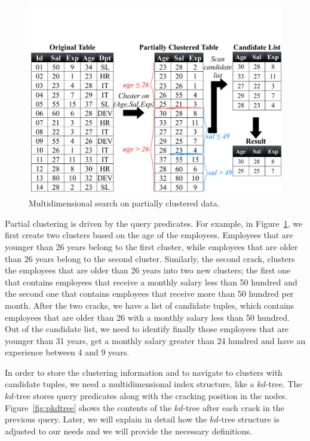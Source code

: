 \begin{figure}[t]
\begin{center}
\vspace*{3\baselineskip}
\includegraphics[trim=0cm 2cm 0cm 8.5cm, width=\columnwidth]{Figures/mcrack_relation}
\caption{Multidimensional search on partially clustered data.}
\label{fig:pcluster}
\end{center}
\end{figure}

Partial clustering is driven by the query predicates. For example, 
in Figure~\ref{fig:pcluster}, we first create two clusters based on the age
of the employees. Employees that are younger than 26 years belong to
the first cluster, while employees that are older than 26 years belong
to the second cluster. Similarly, the second crack, clusters the employees
that are older than 26 years into two new clusters; the first one that
contains employees that receive a monthly salary less than 50 hundred and
the second one that contains employees that receive more than 50 hundred per
month. After the two cracks, we have a list of candidate tuples,
which contains employees that are older than 26 with a monthly salary
less than 50 hundred. Out of the candidate list, we need to identify finally
those employees that are younger than 31 years, get a monthly salary
greater than 24 hundred and have an experience between 4 and 9 years.

In order to store the clustering information and to navigate to 
clusters with candidate tuples, we need a multidimensional index
structure, like a $kd$-tree. The $kd$-tree stores query predicates 
along with the cracking position in the nodes. Figure~\ref{fig:pkdtree}
shows the contents of the $kd$-tree after each crack in the previous
query. Later, we will
explain in detail how the $kd$-tree structure is adjusted to our
needs and we will provide the necessary definitions.

